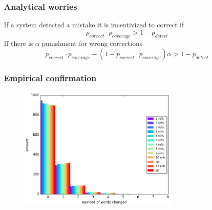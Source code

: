 \documentclass{beamer}
\begin{document}
\begin{frame}
	\frametitle{Analytical worries}
	If a system detected a mistake it is incentivized to correct if 
	$$p_{correct} \cdot p_{coverage} > 1-p_{detect} $$
	If there is $\alpha$ punishment for wrong corrections
	$$p_{correct} \cdot p_{coverage} - \left(1-p_{correct}\cdot p_{coverage}\right) \alpha > 1-p_{detect}$$
\end{frame}
\begin{frame}
	\frametitle{Empirical confirmation}
	\begin{figure}
		\includegraphics[width=8cm]{words_differences_hist_reranking}
	\end{figure}
\end{frame}
\end{document}
